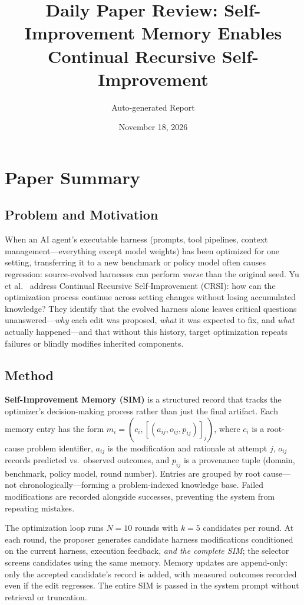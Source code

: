 \documentclass[11pt,a4paper]{article}
\title{Daily Paper Review: Self-Improvement Memory Enables\\Continual Recursive Self-Improvement}
\author{Auto-generated Report}
\date{November 18, 2026}
\begin{document}
\maketitle

\section{Paper Summary}

\subsection{Problem and Motivation}
When an AI agent's executable harness (prompts, tool pipelines, context management---everything except model weights) has been optimized for one setting, transferring it to a new benchmark or policy model often causes regression: source-evolved harnesses can perform \emph{worse} than the original seed. Yu et al.~\cite{yu2026sim} address Continual Recursive Self-Improvement (CRSI): how can the optimization process continue across setting changes without losing accumulated knowledge? They identify that the evolved harness alone leaves critical questions unanswered---\emph{why} each edit was proposed, \emph{what} it was expected to fix, and \emph{what} actually happened---and that without this history, target optimization repeats failures or blindly modifies inherited components.

\subsection{Method}
\textbf{Self-Improvement Memory (SIM)} is a structured record that tracks the optimizer's decision-making process rather than just the final artifact. Each memory entry has the form $m_i = (c_i, [(a_{ij}, o_{ij}, p_{ij})]_j)$, where $c_i$ is a root-cause problem identifier, $a_{ij}$ is the modification and rationale at attempt $j$, $o_{ij}$ records predicted vs.\ observed outcomes, and $p_{ij}$ is a provenance tuple (domain, benchmark, policy model, round number). Entries are grouped by root cause---not chronologically---forming a problem-indexed knowledge base. Failed modifications are recorded alongside successes, preventing the system from repeating mistakes.

The optimization loop runs $N{=}10$ rounds with $k{=}5$ candidates per round. At each round, the proposer generates candidate harness modifications conditioned on the current harness, execution feedback, \emph{and the complete SIM}; the selector screens candidates using the same memory. Memory updates are append-only: only the accepted candidate's record is added, with measured outcomes recorded even if the edit regresses. The entire SIM is passed in the system prompt without retrieval or truncation.
\end{document}
